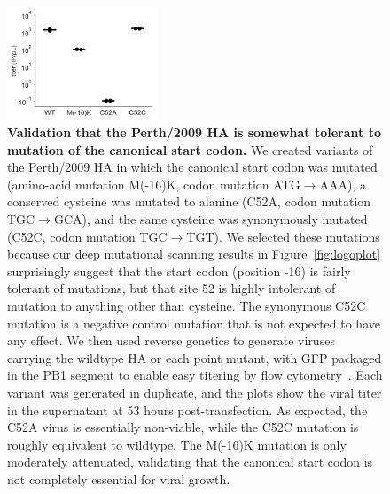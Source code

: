 \documentclass[9pt,twoside,lineno]{pnas-new}
\begin{document}
\begin{figure}
\centerline{\includegraphics[width=0.4\textwidth]{figs/supp_point_mut_validation/startcodon_titers.pdf}}
\caption{
{\bf Validation that the Perth/2009 HA is somewhat tolerant to mutation of the canonical start codon.}
We created variants of the Perth/2009 HA in which the canonical start codon was mutated (amino-acid mutation M(-16)K, codon mutation ATG$\rightarrow$AAA), a conserved cysteine was mutated to alanine (C52A, codon mutation TGC$\rightarrow$GCA), and the same cysteine was synonymously mutated (C52C, codon mutation TGC$\rightarrow$TGT).
We selected these mutations because our deep mutational scanning results in Figure~\ref{fig:logoplot} surprisingly suggest that the start codon (position -16) is fairly tolerant of mutations, but that site 52 is highly intolerant of mutation to anything other than cysteine.
The synonymous C52C mutation is a negative control mutation that is not expected to have any effect.
We then used reverse genetics to generate viruses carrying the wildtype HA or each point mutant, with GFP packaged in the PB1 segment to enable easy titering by flow cytometry~\cite{bloom2010permissive,hooper2013mutant}.
Each variant was generated in duplicate, and the plots show the viral titer in the supernatant at 53 hours post-transfection.
As expected, the C52A virus is essentially non-viable, while the C52C mutation is roughly equivalent to wildtype.
The M(-16)K mutation is only moderately attenuated, validating that the canonical start codon is not completely essential for viral growth.
}
\label{suppfig:startcodon_validation}
\end{figure}
\FloatBarrier
\end{document}
